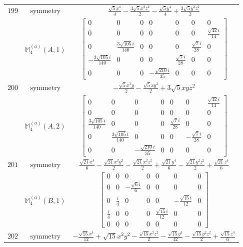 \documentclass[fleqn,8pt,landscape]{jsarticle}
\begin{document}
\begin{longtable}{ccc}
$ 199 $ & $ \text{symmetry} $ & $ \frac{\sqrt{5} x^{4}}{4} - \frac{3 \sqrt{5} x^{2} z^{2}}{2} - \frac{\sqrt{5} y^{4}}{4} + \frac{3 \sqrt{5} y^{2} z^{2}}{2} $ \\
$  $ & $ \mathbb{M}_{4}^{(a)}(A,1) $ & $ \begin{bmatrix} 0 & 0 & 0 & 0 & 0 & 0 & 0 \\ 0 & 0 & 0 & 0 & 0 & 0 & \frac{\sqrt{42} i}{14} \\ 0 & \frac{3 \sqrt{105} i}{140} & 0 & 0 & 0 & \frac{\sqrt{7} i}{28} & 0 \\ - \frac{3 \sqrt{105} i}{140} & 0 & 0 & 0 & \frac{\sqrt{7} i}{28} & 0 & 0 \\ 0 & 0 & 0 & - \frac{\sqrt{210} i}{35} & 0 & 0 & 0 \end{bmatrix} $ \\ \hline
$ 200 $ & $ \text{symmetry} $ & $ - \frac{\sqrt{5} x^{3} y}{2} - \frac{\sqrt{5} x y^{3}}{2} + 3 \sqrt{5} x y z^{2} $ \\
$  $ & $ \mathbb{M}_{4}^{(a)}(A,2) $ & $ \begin{bmatrix} 0 & 0 & 0 & 0 & 0 & 0 & \frac{\sqrt{42} i}{14} \\ 0 & 0 & 0 & 0 & 0 & 0 & 0 \\ \frac{3 \sqrt{105} i}{140} & 0 & 0 & 0 & \frac{\sqrt{7} i}{28} & 0 & 0 \\ 0 & \frac{3 \sqrt{105} i}{140} & 0 & 0 & 0 & - \frac{\sqrt{7} i}{28} & 0 \\ 0 & 0 & - \frac{\sqrt{210} i}{35} & 0 & 0 & 0 & 0 \end{bmatrix} $ \\ \hline
$ 201 $ & $ \text{symmetry} $ & $ \frac{\sqrt{21} x^{4}}{6} - \frac{\sqrt{21} x^{2} y^{2}}{2} - \frac{\sqrt{21} x^{2} z^{2}}{2} + \frac{\sqrt{21} y^{4}}{6} - \frac{\sqrt{21} y^{2} z^{2}}{2} + \frac{\sqrt{21} z^{4}}{6} $ \\
$  $ & $ \mathbb{M}_{4}^{(a)}(B,1) $ & $ \begin{bmatrix} 0 & 0 & 0 & 0 & 0 & 0 & 0 \\ 0 & 0 & - \frac{\sqrt{6} i}{6} & 0 & 0 & 0 & 0 \\ 0 & \frac{i}{4} & 0 & 0 & 0 & - \frac{\sqrt{15} i}{12} & 0 \\ \frac{i}{4} & 0 & 0 & 0 & \frac{\sqrt{15} i}{12} & 0 & 0 \\ 0 & 0 & 0 & 0 & 0 & 0 & 0 \end{bmatrix} $ \\ \hline
$ 202 $ & $ \text{symmetry} $ & $ - \frac{\sqrt{15} x^{4}}{12} + \sqrt{15} x^{2} y^{2} - \frac{\sqrt{15} x^{2} z^{2}}{2} - \frac{\sqrt{15} y^{4}}{12} - \frac{\sqrt{15} y^{2} z^{2}}{2} + \frac{\sqrt{15} z^{4}}{6} $ \\

\end{longtable}
\end{document}
